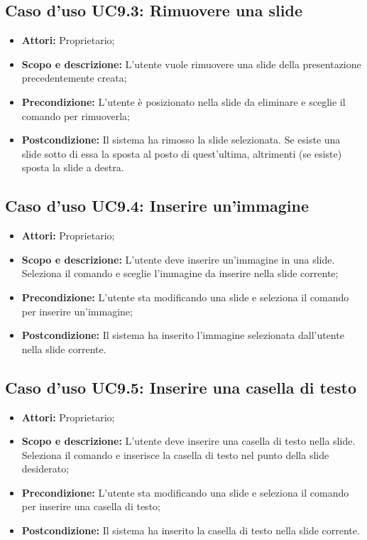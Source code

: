\subsection{Caso d'uso UC9.3: Rimuovere una slide}
\begin{itemize}
	\item \textbf{Attori:} Proprietario;
	\item \textbf{Scopo e descrizione:} L'utente vuole rimuovere una \gls{slide} della presentazione precedentemente creata;
	\item \textbf{Precondizione:} L'utente è posizionato nella \gls{slide} da eliminare e sceglie il comando per rimuoverla;
	\item \textbf{Postcondizione:} Il sistema ha rimosso la \gls{slide} selezionata. Se esiste una \gls{slide} sotto di essa la sposta al posto di quest'ultima, altrimenti (se esiste) sposta la \gls{slide} a destra.
\end{itemize}


\subsection{Caso d'uso UC9.4: Inserire un'immagine}
\begin{itemize}
\item \textbf{Attori:} Proprietario;
\item \textbf{Scopo e descrizione:} L'utente deve inserire un'immagine in una \gls{slide}. Seleziona il comando e sceglie l'immagine da inserire nella \gls{slide} corrente;
\item \textbf{Precondizione:} L'utente sta modificando una \gls{slide} e seleziona il comando per inserire un'immagine;
\item \textbf{Postcondizione:} Il sistema ha inserito l'immagine selezionata dall'utente nella \gls{slide} corrente.
\end{itemize}


\subsection{Caso d'uso UC9.5: Inserire una casella di testo}
\begin{itemize}
\item \textbf{Attori:} Proprietario;
\item \textbf{Scopo e descrizione:} L'utente deve inserire una casella di testo nella \gls{slide}. Seleziona il comando e inserisce la casella di testo nel punto della \gls{slide} desiderato;
\item \textbf{Precondizione:} L'utente sta modificando una \gls{slide} e seleziona il comando per inserire una casella di testo;
\item \textbf{Postcondizione:} Il sistema ha inserito la casella di testo nella \gls{slide} corrente.
\end{itemize}



